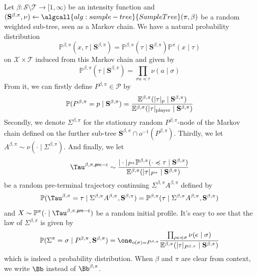 \documentclass[12pt, a4paper]{article}
\begin{document}
\begin{definition}\label{def:branched-rollout-tree}
Let $\beta : \mathcal S \setminus \mathcal T \to [1, \infty)$ be an intensity function and $(\mathbf{S}^{\beta,\pi},\nu) \gets \algcall{alg:sample-tree}{SampleTree}(\pi, \beta)$ be a random weighted sub-tree, seen as a Markov chain.
We have a natural probability distribution
\[
  \mathbb{P}^{\beta, \pi}(x, \tau \mid \mathbf{S}^{\beta, \pi})
  = \mathbb{P}^{\beta, \pi}(\tau \mid \mathbf{S}^{\beta, \pi}) \mathbb{P}^\pi(x \mid \tau)
\]
on $\mathcal{X} \times \mathcal{T}$ induced from this Markov chain and given by
\begin{equation}\label{eq:branched-terminal-law}
    \mathbb{P}^{\beta, \pi}(\tau \mid \mathbf{S}^{\beta, \pi}) = \prod_{\sigma a \preccurlyeq \tau} \nu(a \mid \sigma)
\end{equation}
From it, we can firstly define $P^{\beta, \pi} \in \mathcal{P}$ by
\begin{equation}\label{eq:branched-player-law}
  \mathbb{P}(P^{\beta, \pi} = p \mid \mathbf{S}^{\beta, \pi})
  = \frac{\mathbb{E}^{\beta, \pi}(|\tau|_p \mid \mathbf{S}^{\beta, \pi})}
    {\mathbb{E}^{\beta, \pi}(|\tau|_{\textnormal{player}} \mid \mathbf{S}^{\beta, \pi})}
\end{equation}
Secondly, we denote $\Sigma^{\beta, \pi}$ for the stationary random $P^{\beta, \pi}$-node of the Markov chain defined on the further sub-tree $\mathbf{S}^{\beta, \pi} \cap o^{-1}(P^{\beta, \pi})$.
Thirdly, we let $A^{\beta, \pi} \sim \nu(\cdot \mid \Sigma^{\beta, \pi})$.
And finally, we let
\[
  \Tau^{\beta, \pi, \mathsf{pre-c}} \sim
  \frac{|\cdot|_{P^\pi} \mathbb{P}^{\beta, \pi}(\cdot \preccurlyeq \tau\mid \mathbf{S}^{\beta, \pi})}
       {\mathbb{E}^{\beta, \pi}(|\tau|_{P^\pi} \mid \mathbf{S}^{\beta, \pi})}
\]
be a random pre-terminal trajectory continuing $\Sigma^{\beta, \pi} A^{\beta, \pi}$ defined by
\begin{equation}\label{eq:branched-continuation-law}
  \mathbb{P}(\Tau^{\beta, \pi} = \tau \mid \Sigma^{\beta, \pi} A^{\beta, \pi}, \mathbf{S}^{\beta, \pi})
  = \mathbb{P}^{\beta, \pi}(\tau \mid \Sigma^{\beta, \pi} A^{\beta, \pi}, \mathbf{S}^{\beta, \pi})
\end{equation} 
and $X \sim \mathbb{P}^\pi(\cdot \mid \Tau^{\beta, \pi, \mathsf{pre-c}})$ be a random initial profile.
It's easy to see that the law of $\Sigma^{\beta, \pi}$ is given by
\begin{equation}\label{eq:branched-stationary-node-law}
  \mathbb{P}(\Sigma^\pi = \sigma \mid P^{\beta, \pi}, \mathbf{S}^{\beta, \pi})
  = \one_{o(\sigma) = P^{\beta, \pi}}
    \frac{\prod_{\rho e \preccurlyeq \sigma} \nu(e \mid \sigma)}
         {\mathbb{E}^{\beta, \pi}(|\tau|_{P^{\beta, \pi}} \mid \mathbf{S}^{\beta, \pi})}
\end{equation}
which is indeed a probability distribution.
When $\beta$ and $\pi$ are clear from context, we write $\Bb$ instead of $\Bb^{\beta, \pi}$.
\end{definition}
\end{document}
